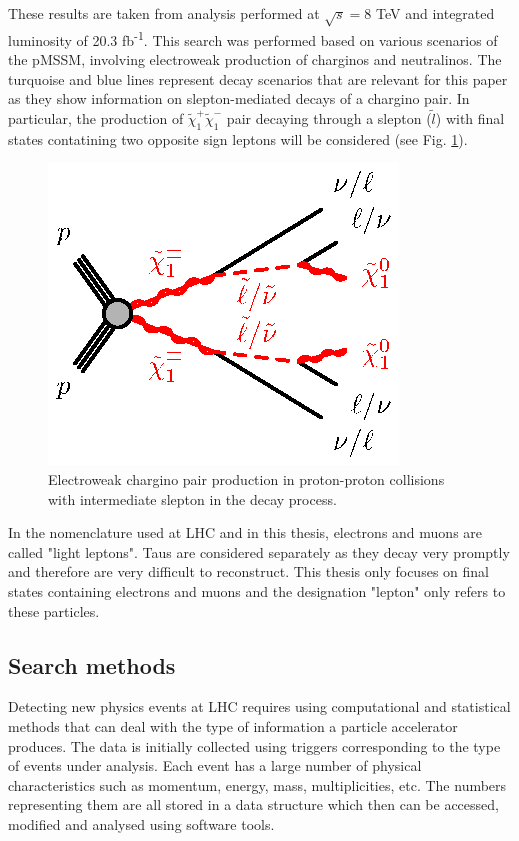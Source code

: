 These results are taken from \citep{atlas2015search} analysis performed at $\sqrt{s}=$8 TeV and integrated luminosity of 20.3 fb\textsuperscript{-1}. This search was performed based on various scenarios of the pMSSM, involving electroweak production of charginos and neutralinos. The turquoise and blue lines represent decay scenarios that are relevant for this paper as they show information on slepton-mediated decays of a chargino pair. 
In particular, the production of $\tilde{\chi}^{+}_{1}\tilde{\chi}^{-}_{1}$ pair decaying through a slepton ($\tilde{l}$) with final states contatining two opposite sign leptons will be considered (see Fig. \ref{fig:EWchargino}). 
\begin{figure}[!h]
  \centering   	
  	\captionsetup{width=0.8\textwidth}
	\includegraphics[]{Chap2/C1C1-llvvN1N1-slsnu}	
\caption[Optional caption for list of figures]{Electroweak chargino pair production in proton-proton collisions with intermediate slepton in the decay process.}\label{fig:EWchargino}
\end{figure}  

In the nomenclature used at LHC and in this thesis, electrons and muons are called "light leptons". Taus are considered separately as they decay very promptly and therefore are very difficult to reconstruct. This thesis only focuses on final states containing electrons and muons and the designation "lepton" only refers to these particles.  



\subsection{Search methods}
Detecting new physics events at LHC requires using computational and statistical methods that can deal with the type of information a particle accelerator produces. The data is initially collected using triggers corresponding to the type of events under analysis. Each event has a large number of physical characteristics such as momentum, energy, mass, multiplicities, etc. The numbers representing them are all stored in a data structure which then can be accessed, modified and analysed using software tools. 

